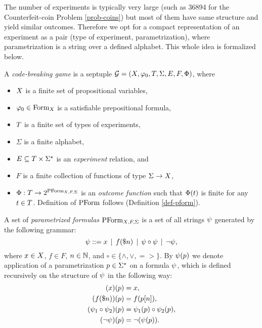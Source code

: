 The number of experiments is typically very large
  (such as 36894 for the Counterfeit-coin Problem \ref{prob-coins})
  but most of them have same structure and yield similar outcomes.
Therefore we opt for a compact representation of an experiment as a pair
  (type of experiment, parametrization), where parametrization is a string
  over a defined alphabet.
This whole idea is formalized below.

\begin{definition} \label{def-game}
A \emph{code-breaking game} is a septuple
  $\mathcal{G} = (X, \varphi_0, T, \Sigma, E, F, \Phi)$, where
  \begin{itemize}
  \item $X$ is a finite set of propositional variables,
  \item $\varphi_0 \in \textrm{Form}_X$ is a satisfiable prepositional formula,
  \item $T$ is a finite set of types of experiments,
  \item $\Sigma$ is a finite alphabet,
  \item $E \subseteq T \times \Sigma^\star$ is an \emph{experiment} relation,
  and
  \item $F$ is a finite collection of functions of type $\Sigma -> X$,
  \item $\Phi: T -> 2^{\textrm{PForm}_{X,F,\Sigma}}$ is an
  \emph{outcome function} such that $\Phi(t)$ is finite
  for any $t\in T$. Definition of $\textrm{PForm}$ follows (Definition \ref{def-pform}).
  \end{itemize}
\end{definition}

\begin{definition} \label{def-pform}
A set of \emph{parametrized formulas} $\textrm{PForm}_{X,F,\Sigma}$ is a set of
 all strings $\psi$ generated by the following grammar:
$$ \psi ::= x \:\:|\:\: f(\$n) \:\:|\:\: \psi \circ \psi \:\:|\:\: \neg \psi,$$
where $x\in X$, $f\in F$, $n \in\mathbb{N}$, and $\circ\in\{\wedge, \vee, =>\}$.
By $\psi(p)$ we denote application of a parametrization $p\in\Sigma^\star$
on a formula $\psi$, which is defined recursively on the structure of $\psi$ in the following way:
\begin{align}
(x)(p) &= x, \\
(f(\$n))(p) &= f(p[n]),\\
(\psi_1\circ\psi_2)(p) &= \psi_1(p) \circ \psi_2(p),\\
(\neg\psi)(p) &= \neg(\psi(p)).
\end{align}
\end{definition}

